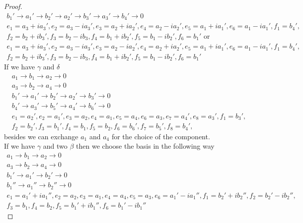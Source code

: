 \documentclass[12pt]{amsart}
\theoremstyle{definition}
\theoremstyle{remark}
\numberwithin{equation}{subsection}
\begin{document}
\begin{proof}
\begin{equation}
\begin{gathered}
    b_1' \rightarrow a_1' \rightarrow b_2' \rightarrow a_2' \rightarrow b_3' \rightarrow a_3' \rightarrow b_4' \rightarrow 0\\
    e_{1}=a_3+ia_3',e_{2}=a_3-ia_3', e_{3}=a_2+ia_2', e_{4}=a_2-ia_2',e_{5}=a_1+ia_1',e_{6}=a_1-ia_1', f_{1}=b_4',\\ f_{2}=b_2 + ib_3',f_{3}=b_2 -ib_3, f_{4}=b_1+ib_2',f_{5}=b_1-ib_2',f_{6}=b_1' \text{ or }\\
    e_{1}=a_3+ia_3',e_{2}=a_3-ia_3', e_{3}=a_2-ia_2', e_{4}=a_2+ia_2',e_{5}=a_1+ia_1',e_{6}=a_1-ia_1', f_{1}=b_4',\\ f_{2}=b_2 + ib_3',f_{3}=b_2 -ib_3, f_{4}=b_1+ib_2',f_{5}=b_1-ib_2',f_{6}=b_1'
\end{gathered}
\end{equation}
If we have $\gamma$ and $\delta$
\begin{equation}
\begin{gathered}
    a_1 \rightarrow b_1 \rightarrow a_2 \rightarrow 0\\
    a_3 \rightarrow b_2 \rightarrow a_4 \rightarrow 0\\
    b_1' \rightarrow a_1' \rightarrow b_2' \rightarrow a_2' \rightarrow b_3' \rightarrow 0\\
    b_4' \rightarrow a_3' \rightarrow b_5' \rightarrow a_4' \rightarrow b_6' \rightarrow 0\\
    e_{1}=a_2',e_{2}=a_1', e_{3}=a_2, e_{4}=a_1,e_{5}=a_4,e_{6}=a_3,e_{7}=a_4',e_{8}=a_3', f_{1}=b_3',\\ f_{2}=b_2', f_{3}=b_1', f_{4}=b_1,f_{5}=b_2,f_{6}=b_6',f_{7}=b_5',f_{8}=b_4', 
\end{gathered}
\end{equation}
besides we can exchange $a_1$ and $a_4$ for the choice of the component.\\
If we have $\gamma$ and two $\beta$ then we choose the basis in the following way
\begin{equation}
\begin{gathered}
    a_1 \rightarrow b_1 \rightarrow a_2 \rightarrow 0\\
    a_3 \rightarrow b_2 \rightarrow a_4 \rightarrow 0\\
    b_1' \rightarrow a_1' \rightarrow b_2' \rightarrow 0\\
    b_1'' \rightarrow a_1'' \rightarrow b_2'' \rightarrow 0\\
    e_{1}=a_1'+ia_1'',e_{2}=a_2, e_{3}=a_1, e_{4}=a_4,e_{5}=a_3,e_{6}=a_1'-ia_1'', f_{1}=b_2'+ib_2'', f_{2}=b_2'-ib_2'',\\ f_{3}=b_1, f_{4}=b_2,f_{5}=b_1'+ib_1'',f_{6}=b_1'-ib_1''

\end{gathered}
\end{equation}
\end{proof}
\end{document}
